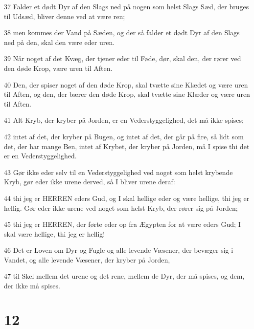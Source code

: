 \par 37 Falder et dødt Dyr af den Slags ned på nogen som helst Slags Sæd, der bruges til Udsæd, bliver denne ved at være ren;
\par 38 men kommes der Vand på Sæden, og der så falder et dødt Dyr af den Slags ned på den, skal den være eder uren.
\par 39 Når noget af det Kvæg, der tjener eder til Føde, dør, skal den, der rører ved den døde Krop, være uren til Aften.
\par 40 Den, der spiser noget af den døde Krop, skal tvætte sine Klædet og være uren til Aften, og den, der bærer den døde Krop, skal tvætte sine Klæder og være uren til Aften.
\par 41 Alt Kryb, der kryber på Jorden, er en Vederstyggelighed, det må ikke spises;
\par 42 intet af det, der kryber på Bugen, og intet af det, der går på fire, så lidt som det, der har mange Ben, intet af Krybet, der kryber på Jorden, må I spise thi det er en Vederstyggelighed.
\par 43 Gør ikke eder selv til en Vederstyggelighed ved noget som helst krybende Kryb, gør eder ikke urene derved, så I bliver urene deraf:
\par 44 thi jeg er HERREN eders Gud, og I skal hellige eder og være hellige, thi jeg er hellig. Gør eder ikke urene ved noget som helst Kryb, der rører sig på Jorden;
\par 45 thi jeg er HERREN, der førte eder op fra Ægypten for at være eders Gud; I skal være hellige, thi jeg er hellig!
\par 46 Det er Loven om Dyr og Fugle og alle levende Væsener, der bevæger sig i Vandet, og alle levende Væsener, der kryber på Jorden,
\par 47 til Skel mellem det urene og det rene, mellem de Dyr, der må spises, og dem, der ikke må spises.

\chapter{12}

